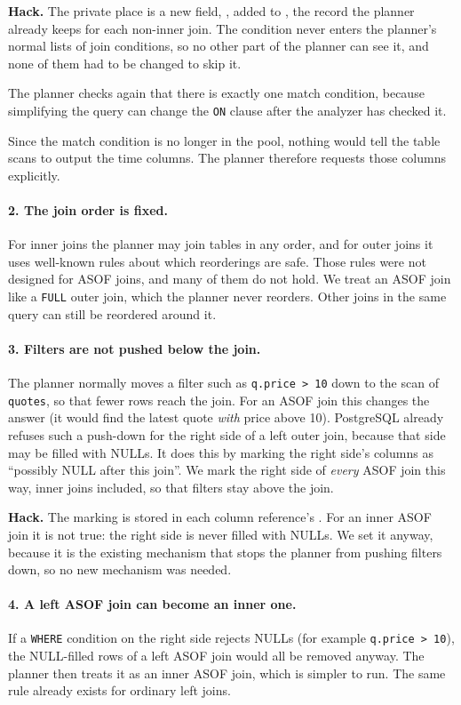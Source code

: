 \documentclass[11pt,a4paper]{article}
\newcommand{\code}[1]{\texttt{#1}}
\begin{document}
\textbf{Hack.} The private place is a new field, , added to
, the record the planner already keeps for each non-inner join.
The condition never enters the planner's normal lists of join conditions, so no other
part of the planner can see it, and none of them had to be changed to skip it.

The planner checks again that there is exactly one match condition, because simplifying
the query can change the \code{ON} clause after the analyzer has checked it.

Since the match condition is no longer in the pool, nothing would tell the table scans to
output the time columns. The planner therefore requests those columns explicitly.

\paragraph{2. The join order is fixed.}
For inner joins the planner may join tables in any order, and for outer joins it uses
well-known rules about which reorderings are safe. Those rules were not designed for ASOF
joins, and many of them do not hold. We treat an ASOF join like a \code{FULL} outer join,
which the planner never reorders. Other joins in the same query can still be reordered
around it.

\paragraph{3. Filters are not pushed below the join.}
The planner normally moves a filter such as \code{q.price > 10} down to the scan of
\code{quotes}, so that fewer rows reach the join. For an ASOF join this changes the
answer (it would find the latest quote \emph{with} price above 10). PostgreSQL already
refuses such a push-down for the right side of a left outer join, because that side may
be filled with NULLs. It does this by marking the right side's columns as ``possibly NULL
after this join''. We mark the right side of \emph{every} ASOF join this way, inner joins
included, so that filters stay above the join.

\textbf{Hack.} The marking is stored in each column reference's .
For an inner ASOF join it is not true: the right side is never filled with NULLs. We
set it anyway, because it is the existing mechanism that stops the planner from pushing
filters down, so no new mechanism was needed.

\paragraph{4. A left ASOF join can become an inner one.}
If a \code{WHERE} condition on the right side rejects NULLs (for example
\code{q.price > 10}), the NULL-filled rows of a left ASOF join would all be removed
anyway. The planner then treats it as an inner ASOF join, which is simpler to run. The
same rule already exists for ordinary left joins.
\end{document}
